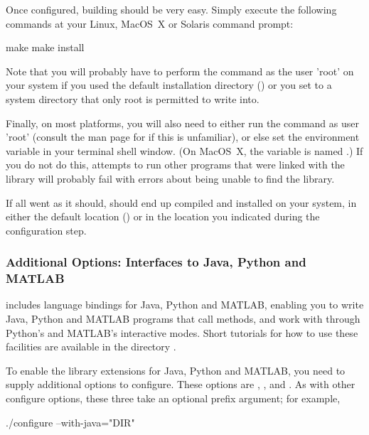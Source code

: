 \documentclass{sbmlmanual}
\begin{document}
Once configured, building should be very easy.  Simply execute the
following commands at your Linux, MacOS~X or Solaris command prompt:

\begin{example}[csh]
  make
  make install
\end{example}

Note that you will probably have to perform the 
command as the user 'root' on your system if you used the default
installation directory () or you set  to
a system directory that only root is permitted to write into.

Finally, on most platforms, you will also need to either run the command
 as user 'root' (consult the man page for 
if this is unfamiliar), or else set the environment variable
 in your terminal shell window.  (On MacOS~X, the
variable is named .)  If you do not do this,
attempts to run other programs that were linked with the \libsbml{} library
will probably fail with errors about being unable to find the library.

If all went as it should, \libsbml{} should end up compiled and installed
on your system, in either the default location () or in
the location you indicated during the configuration step.


\subsubsection{Additional Options: Interfaces to Java, Python and MATLAB}

\libsbml{} includes language bindings for Java, Python and MATLAB, enabling
you to write Java, Python and MATLAB programs that call \libsbml{} methods,
and work with \libsbml{} through Python's and MATLAB's interactive modes.
Short tutorials for how to use these facilities are available in the
directory .

To enable the library extensions for Java, Python and MATLAB, you need to
supply additional options to configure.  These options are
, , and .  As
with other configure options, these three take an optional prefix
argument; for example,

\begin{example}[csh]
  ./configure --with-java="DIR"
\end{example}
\end{document}
